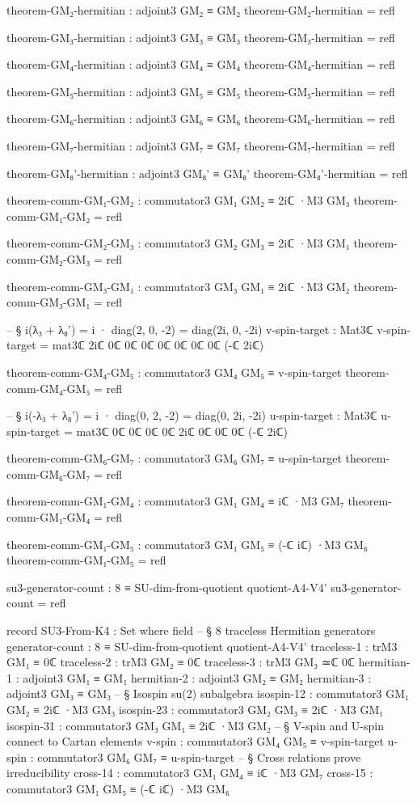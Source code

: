 \documentclass[11pt,a4paper]{book}
\begin{document}
\begin{code}
theorem-GM₂-hermitian : adjoint3 GM₂ ≡ GM₂
theorem-GM₂-hermitian = refl

theorem-GM₃-hermitian : adjoint3 GM₃ ≡ GM₃
theorem-GM₃-hermitian = refl

theorem-GM₄-hermitian : adjoint3 GM₄ ≡ GM₄
theorem-GM₄-hermitian = refl

theorem-GM₅-hermitian : adjoint3 GM₅ ≡ GM₅
theorem-GM₅-hermitian = refl

theorem-GM₆-hermitian : adjoint3 GM₆ ≡ GM₆
theorem-GM₆-hermitian = refl

theorem-GM₇-hermitian : adjoint3 GM₇ ≡ GM₇
theorem-GM₇-hermitian = refl

theorem-GM₈'-hermitian : adjoint3 GM₈' ≡ GM₈'
theorem-GM₈'-hermitian = refl

theorem-comm-GM₁-GM₂ : commutator3 GM₁ GM₂ ≡ 2iℂ ·M3 GM₃
theorem-comm-GM₁-GM₂ = refl

theorem-comm-GM₂-GM₃ : commutator3 GM₂ GM₃ ≡ 2iℂ ·M3 GM₁
theorem-comm-GM₂-GM₃ = refl

theorem-comm-GM₃-GM₁ : commutator3 GM₃ GM₁ ≡ 2iℂ ·M3 GM₂
theorem-comm-GM₃-GM₁ = refl

-- § i(λ₃ + λ₈') = i · diag(2, 0, -2) = diag(2i, 0, -2i)
v-spin-target : Mat3ℂ
v-spin-target = mat3ℂ 2iℂ 0ℂ 0ℂ  0ℂ 0ℂ 0ℂ  0ℂ 0ℂ (-ℂ 2iℂ)

theorem-comm-GM₄-GM₅ : commutator3 GM₄ GM₅ ≡ v-spin-target
theorem-comm-GM₄-GM₅ = refl

-- § i(-λ₃ + λ₈') = i · diag(0, 2, -2) = diag(0, 2i, -2i)
u-spin-target : Mat3ℂ
u-spin-target = mat3ℂ 0ℂ 0ℂ 0ℂ  0ℂ 2iℂ 0ℂ  0ℂ 0ℂ (-ℂ 2iℂ)

theorem-comm-GM₆-GM₇ : commutator3 GM₆ GM₇ ≡ u-spin-target
theorem-comm-GM₆-GM₇ = refl

theorem-comm-GM₁-GM₄ : commutator3 GM₁ GM₄ ≡ iℂ ·M3 GM₇
theorem-comm-GM₁-GM₄ = refl

theorem-comm-GM₁-GM₅ : commutator3 GM₁ GM₅ ≡ (-ℂ iℂ) ·M3 GM₆
theorem-comm-GM₁-GM₅ = refl

su3-generator-count : 8 ≡ SU-dim-from-quotient quotient-A4-V4'
su3-generator-count = refl

record SU3-From-K4 : Set where
  field
    -- § 8 traceless Hermitian generators
    generator-count     : 8 ≡ SU-dim-from-quotient quotient-A4-V4'
    traceless-1 : trM3 GM₁ ≡ 0ℂ
    traceless-2 : trM3 GM₂ ≡ 0ℂ
    traceless-3 : trM3 GM₃ ≃ℂ 0ℂ
    hermitian-1 : adjoint3 GM₁ ≡ GM₁
    hermitian-2 : adjoint3 GM₂ ≡ GM₂
    hermitian-3 : adjoint3 GM₃ ≡ GM₃
    -- § Isospin su(2) subalgebra
    isospin-12  : commutator3 GM₁ GM₂ ≡ 2iℂ ·M3 GM₃
    isospin-23  : commutator3 GM₂ GM₃ ≡ 2iℂ ·M3 GM₁
    isospin-31  : commutator3 GM₃ GM₁ ≡ 2iℂ ·M3 GM₂
    -- § V-spin and U-spin connect to Cartan elements
    v-spin      : commutator3 GM₄ GM₅ ≡ v-spin-target
    u-spin      : commutator3 GM₆ GM₇ ≡ u-spin-target
    -- § Cross relations prove irreducibility
    cross-14    : commutator3 GM₁ GM₄ ≡ iℂ ·M3 GM₇
    cross-15    : commutator3 GM₁ GM₅ ≡ (-ℂ iℂ) ·M3 GM₆


\end{code}
\end{document}
